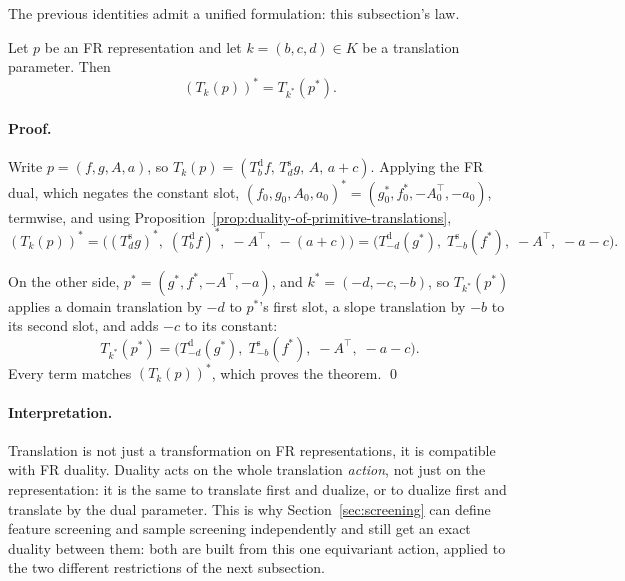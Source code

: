 

The previous identities admit a unified formulation: this
subsection's law.

\begin{proposition}
\label{thm:fenchel-equivariance}
Let \(p\) be an FR representation and let \(k=(b,c,d)\in K\) be a translation
parameter. Then
\[
(T_k(p))^*
=
T_{k^*}(p^*).
\]
\end{proposition}

\paragraph{Proof.}
Write \(p=(f,g,A,a)\), so \(T_k(p)=(T^{\mathrm d}_bf,\,T^{\mathrm
s}_dg,\,A,\,a+c)\). Applying the FR dual, which negates the constant
slot, \((f_0,g_0,A_0,a_0)^*=(g_0^*,f_0^*,-A_0^\top,-a_0)\), termwise, and
using Proposition~\ref{prop:duality-of-primitive-translations},
\[
(T_k(p))^*
=
\big(
(T^{\mathrm s}_dg)^*,\;
(T^{\mathrm d}_bf)^*,\;
-A^\top,\;
-(a+c)
\big)
=
\big(
T^{\mathrm d}_{-d}(g^*),\;
T^{\mathrm s}_{-b}(f^*),\;
-A^\top,\;
-a-c
\big).
\]

On the other side, \(p^*=(g^*,f^*,-A^\top,-a)\), and \(k^*=(-d,-c,-b)\),
so \(T_{k^*}(p^*)\) applies a domain translation by \(-d\) to \(p^*\)'s
first slot, a slope translation by \(-b\) to its second slot, and adds
\(-c\) to its constant:
\[
T_{k^*}(p^*)
=
\big(
T^{\mathrm d}_{-d}(g^*),\;
T^{\mathrm s}_{-b}(f^*),\;
-A^\top,\;
-a-c
\big).
\]
Every term matches \((T_k(p))^*\), which proves the theorem.
\qed

\paragraph{Interpretation.}
Translation is not just a transformation on FR representations, it is
compatible with FR duality. Duality acts on the whole
translation \emph{action}, not just on the representation: it is the
same to translate first and dualize, or to dualize first and translate
by the dual parameter. This is why Section~\ref{sec:screening} can
define feature screening and sample screening independently and still
get an exact duality between them: both are built from this one
equivariant action, applied to the two different restrictions of the
next subsection.










